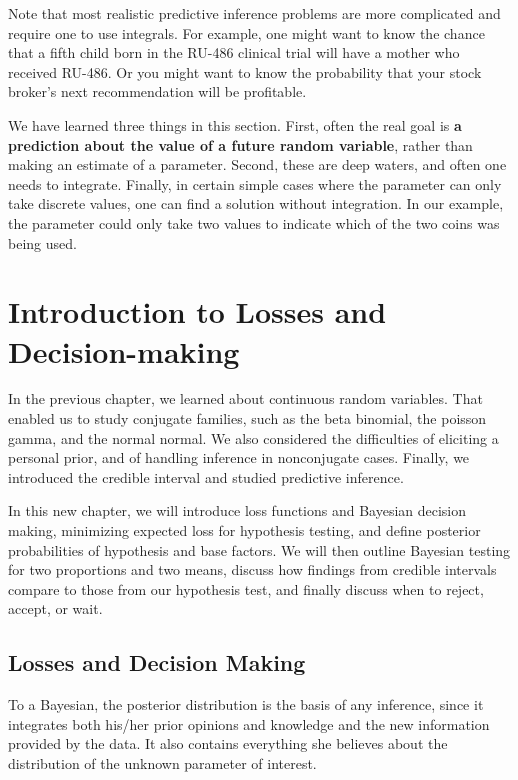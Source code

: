 \documentclass[]{book}
\theoremstyle{definition}
\theoremstyle{definition}
\theoremstyle{definition}
\theoremstyle{remark}
\begin{document}
Note that most realistic predictive inference problems are more
complicated and require one to use integrals. For example, one might
want to know the chance that a fifth child born in the RU-486 clinical
trial will have a mother who received RU-486. Or you might want to know
the probability that your stock broker's next recommendation will be
profitable.

We have learned three things in this section. First, often the real goal
is \textbf{a prediction about the value of a future random variable},
rather than making an estimate of a parameter. Second, these are deep
waters, and often one needs to integrate. Finally, in certain simple
cases where the parameter can only take discrete values, one can find a
solution without integration. In our example, the parameter could only
take two values to indicate which of the two coins was being used.

\chapter{Introduction to Losses and
Decision-making}\label{introduction-to-losses-and-decision-making}

In the previous chapter, we learned about continuous random variables.
That enabled us to study conjugate families, such as the beta binomial,
the poisson gamma, and the normal normal. We also considered the
difficulties of eliciting a personal prior, and of handling inference in
nonconjugate cases. Finally, we introduced the credible interval and
studied predictive inference.

In this new chapter, we will introduce loss functions and Bayesian
decision making, minimizing expected loss for hypothesis testing, and
define posterior probabilities of hypothesis and base factors. We will
then outline Bayesian testing for two proportions and two means, discuss
how findings from credible intervals compare to those from our
hypothesis test, and finally discuss when to reject, accept, or wait.

\section{Losses and Decision Making}\label{losses-and-decision-making}

To a Bayesian, the posterior distribution is the basis of any inference,
since it integrates both his/her prior opinions and knowledge and the
new information provided by the data. It also contains everything she
believes about the distribution of the unknown parameter of interest.
\end{document}
